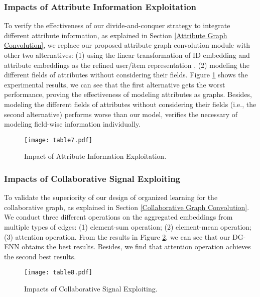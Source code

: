 \subsubsection{Impacts of Attribute Information Exploitation}
To verify the effectiveness of our divide-and-conquer strategy to integrate different attribute information, as explained in Section \ref{Attribute Graph Convolution}, 
we replace our proposed attribute graph convolution module with other two alternatives: (1) using the linear transformation of ID embedding and attribute embeddings as the refined user/item representation \cite{kipf2016semi,berg2017graph}, (2) modeling the different fields of attributes without considering their fields.
Figure \ref{fig:figureInformationExploitation} shows the experimental results, we can see that the first alternative gets the worst performance, proving the effectiveness of modeling attributes as graphs.
Besides, modeling the different fields of attributes without considering their fields (i.e., the second alternative) performs worse than our model, verifies the necessary of modeling field-wise information individually.
\begin{figure}[htp]
	\centering
	\setlength{\belowcaptionskip}{-0.3cm}
	\setlength{\abovecaptionskip}{0cm}
	\texttt{[image: table7.pdf]}
	\caption{Impact of Attribute Information Exploitation.}
	\label{fig:figureInformationExploitation}
\end{figure}

\subsubsection{Impacts of Collaborative Signal Exploiting}
To validate the superiority of our design of organized learning for the collaborative graph, as explained in Section \ref{Collaborative Graph Convolution}.
We conduct three different operations on the aggregated embeddings from multiple types of edges: 
(1) element-sum operation; (2) element-mean operation; (3)  attention operation.
From the results in Figure \ref{fig:figureCollaborativeSignalExploiting}, we can see that our DG-ENN obtains the best results.
Besides, we find that attention operation achieves the second best results.
\begin{figure}[htp]
	\centering
	\setlength{\belowcaptionskip}{-0.3cm}
	\setlength{\abovecaptionskip}{0cm}
	\texttt{[image: table8.pdf]}
	\caption{Impacts of Collaborative Signal Exploiting.}
	\label{fig:figureCollaborativeSignalExploiting}
\end{figure}
